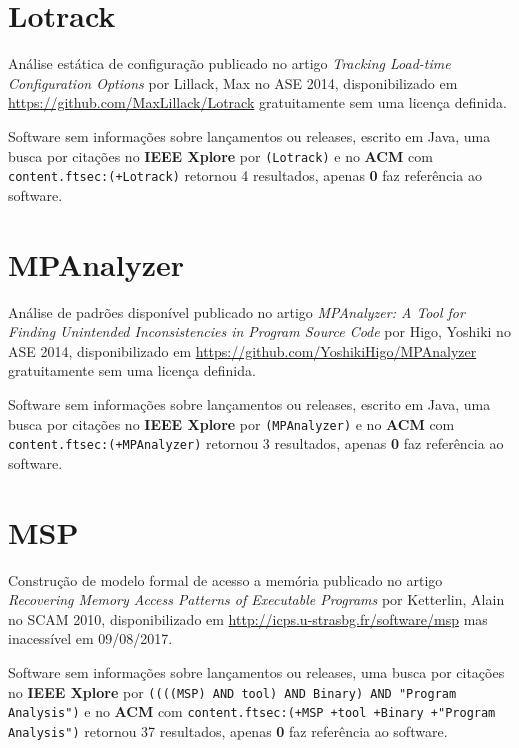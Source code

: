 \section{Lotrack}

Análise estática de configuração
publicado no artigo {\it Tracking Load-time Configuration Options}
por Lillack, Max
no ASE 2014,
disponibilizado em \url{https://github.com/MaxLillack/Lotrack}
gratuitamente
sem uma licença definida.

Software sem informações sobre lançamentos ou releases,
escrito em Java,
uma busca por citações no {\bf IEEE Xplore} por
\texttt{(Lotrack)}
e no {\bf ACM} com
\texttt{content.ftsec:(+Lotrack)}
retornou
4 resultados, apenas
{\bf 0} faz referência ao software.



\section{MPAnalyzer}

Análise de padrões disponível
publicado no artigo {\it MPAnalyzer: A Tool for Finding Unintended Inconsistencies in Program Source Code}
por Higo, Yoshiki
no ASE 2014,
disponibilizado em \url{https://github.com/YoshikiHigo/MPAnalyzer}
gratuitamente
sem uma licença definida.

Software sem informações sobre lançamentos ou releases,
escrito em Java,
uma busca por citações no {\bf IEEE Xplore} por
\texttt{(MPAnalyzer)}
e no {\bf ACM} com
\texttt{content.ftsec:(+MPAnalyzer)}
retornou
3 resultados, apenas
{\bf 0} faz referência ao software.



\section{MSP}

Construção de modelo formal de acesso a memória
publicado no artigo {\it Recovering Memory Access Patterns of Executable Programs}
por Ketterlin, Alain
no SCAM 2010,
disponibilizado em \url{http://icps.u-strasbg.fr/software/msp}
mas inacessível em 09/08/2017.

Software sem informações sobre lançamentos ou releases,
uma busca por citações no {\bf IEEE Xplore} por
\texttt{((((MSP) AND tool) AND Binary) AND "Program Analysis")}
e no {\bf ACM} com
\texttt{content.ftsec:(+MSP +tool +Binary +"Program Analysis")}
retornou
37 resultados, apenas
{\bf 0} faz referência ao software.



